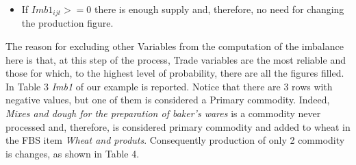 \documentclass[]{article}
\providecommand{\tightlist}{%
  \setlength{\itemsep}{0pt}\setlength{\parskip}{0pt}}
\begin{document}
\begin{itemize}
\tightlist
\item
  If \(Imb1_{ijt} >= 0\) there is enough supply and, therefore, no need
  for changing the production figure.
\end{itemize}

The reason for excluding other Variables from the computation of the
imbalance here is that, at this step of the process, Trade variables are
the most reliable and those for which, to the highest level of
probability, there are all the figures filled. In Table 3 \emph{Imb1} of
our example is reported. Notice that there are 3 rows with negative
values, but one of them is considered a Primary commodity. Indeed,
\emph{Mixes and dough for the preparation of baker's wares} is a
commodity never processed and, therefore, is considered primary
commodity and added to wheat in the FBS item \emph{Wheat and produts}.
Consequently production of only 2 commodity is changes, as shown in
Table 4.
\end{document}
